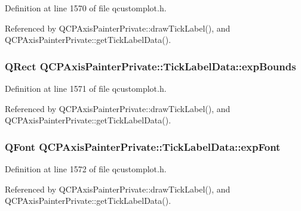 Definition at line 1570 of file qcustomplot.\+h.



Referenced by Q\+C\+P\+Axis\+Painter\+Private\+::draw\+Tick\+Label(), and Q\+C\+P\+Axis\+Painter\+Private\+::get\+Tick\+Label\+Data().

\hypertarget{struct_q_c_p_axis_painter_private_1_1_tick_label_data_a6722d2bcefb93011e9dc42301b966846}{}
\subsubsection[{exp\+Bounds}]{\setlength{\rightskip}{0pt plus 5cm}Q\+Rect Q\+C\+P\+Axis\+Painter\+Private\+::\+Tick\+Label\+Data\+::exp\+Bounds}\label{struct_q_c_p_axis_painter_private_1_1_tick_label_data_a6722d2bcefb93011e9dc42301b966846}


Definition at line 1571 of file qcustomplot.\+h.



Referenced by Q\+C\+P\+Axis\+Painter\+Private\+::draw\+Tick\+Label(), and Q\+C\+P\+Axis\+Painter\+Private\+::get\+Tick\+Label\+Data().

\hypertarget{struct_q_c_p_axis_painter_private_1_1_tick_label_data_adc10767ebcb719d6927c012a38b9d933}{}
\subsubsection[{exp\+Font}]{\setlength{\rightskip}{0pt plus 5cm}Q\+Font Q\+C\+P\+Axis\+Painter\+Private\+::\+Tick\+Label\+Data\+::exp\+Font}\label{struct_q_c_p_axis_painter_private_1_1_tick_label_data_adc10767ebcb719d6927c012a38b9d933}


Definition at line 1572 of file qcustomplot.\+h.



Referenced by Q\+C\+P\+Axis\+Painter\+Private\+::draw\+Tick\+Label(), and Q\+C\+P\+Axis\+Painter\+Private\+::get\+Tick\+Label\+Data().

\hypertarget{struct_q_c_p_axis_painter_private_1_1_tick_label_data_a09692e4ea092137278b4ac051d5fdf2b}{}
